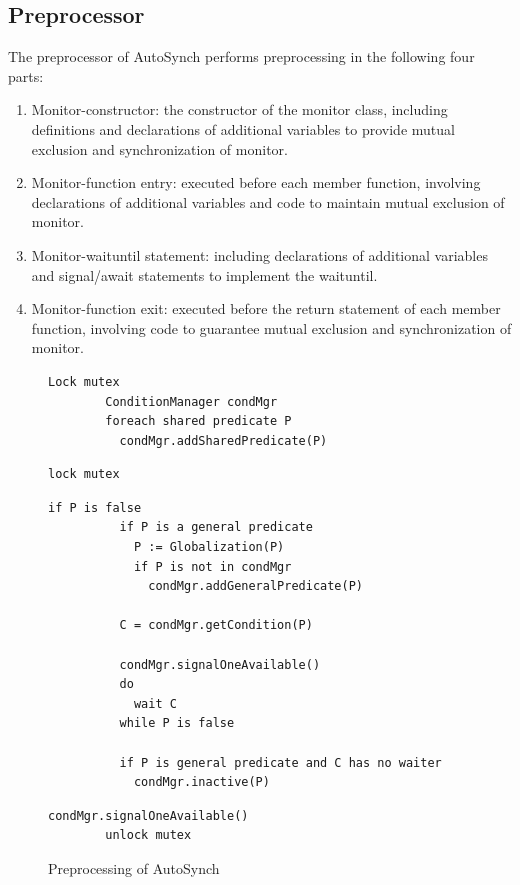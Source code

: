 \documentclass[preprint]{sigplanconf}
\begin{document}
\subsection{Preprocessor}
The preprocessor of AutoSynch performs preprocessing in the following four 
parts:
\begin{enumerate}
  \item Monitor-constructor: the constructor of the monitor class, including 
    definitions and declarations of additional variables to provide mutual 
    exclusion and synchronization of monitor. 
  \item Monitor-function entry: executed before each member function, 
    involving declarations of additional variables and code to maintain
    mutual exclusion of monitor. 
  \item Monitor-waituntil statement: including declarations of additional
    variables and signal/await statements to implement the waituntil.
  \item Monitor-function exit: executed before the return statement of 
    each member function, involving code to guarantee mutual exclusion and 
    synchronization of monitor. 
\end{enumerate}
\begin{figure}[ht!]
    \begin{Verbatim}[fontsize=\footnotesize,gobble=8,frame=topline,
            framesep=3mm,label=\fbox{\small\emph{Constructor}}]
        Lock mutex
        ConditionManager condMgr 
        foreach shared predicate P
          condMgr.addSharedPredicate(P)
    \end{Verbatim}
    \begin{Verbatim}[fontsize=\footnotesize,gobble=8,frame=topline,
            framesep=3mm,label=\fbox{\small\emph{Entry}}]
        lock mutex
    \end{Verbatim}
    \begin{Verbatim}[fontsize=\footnotesize,gobble=8,frame=topline,
            framesep=3mm,label=\fbox{\small\emph{Waituntil(P)}}]
        if P is false 
          if P is a general predicate 
            P := Globalization(P)
            if P is not in condMgr
              condMgr.addGeneralPredicate(P)
              
          C = condMgr.getCondition(P)
        
          condMgr.signalOneAvailable()
          do 
            wait C
          while P is false
       
          if P is general predicate and C has no waiter
            condMgr.inactive(P) 
    \end{Verbatim}
    \begin{Verbatim}[fontsize=\footnotesize,gobble=8,frame=lines,
            framesep=3mm,label=\fbox{\small\emph{Exit}}]
        condMgr.signalOneAvailable() 
        unlock mutex
    \end{Verbatim}
  \caption{Preprocessing of AutoSynch}
  \label{fig:prep}
\end{figure}  
\end{document}
